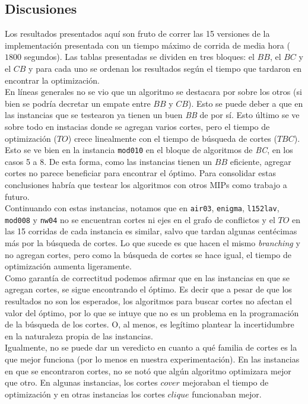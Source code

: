 \subsection{Discusiones}

Los resultados presentados aquí son fruto de correr las 15 versiones de la implementación presentada con un tiempo máximo de corrida de media hora ($1800$ segundos). Las tablas presentadas se dividen en tres bloques: el $BB$, el $BC$ y el $CB$ y para cada uno se ordenan los resultados según el tiempo que tardaron en encontrar la optimización.\\

En líneas generales no se vio que un algoritmo se destacara por sobre los otros (si bien se podría decretar un empate entre $BB$ y $CB$). Esto se puede deber a que en las instancias que se testearon ya tienen un buen \textit{BB} de por sí. Esto último se ve sobre todo en instacias donde se agregan varios cortes, pero el tiempo de optimización ($TO$) crece linealmente con el tiempo de búsqueda de cortes ($TBC$). Esto se ve bien en la instancia \verb_mod010_ en el bloque de algoritmos de \textit{BC}, en los casos 5 a 8. De esta forma, como las instancias tienen un $BB$ eficiente, agregar cortes no parece beneficiar para encontrar el óptimo. Para consolidar estas conclusiones habría que testear los algoritmos con otros MIPs como trabajo a futuro.\\

Continuando con estas instancias, notamos que en \verb_air03_, \verb_enigma_, \verb_l152lav_, \verb_mod008_  y \verb_nw04_ no se encuentran cortes ni ejes en el grafo de conflictos y el $TO$ en las 15 corridas de cada instancia es similar, salvo que tardan algunas centécimas más por la búsqueda de cortes. Lo que sucede es que hacen el mismo \emph{branching} y no agregan cortes, pero como la búsqueda de cortes se hace igual, el tiempo de optimización aumenta ligeramente.\\

Como garantía de correctitud podemos afirmar que en las instancias en que se agregan cortes, se sigue encontrando el óptimo. Es decir que a pesar de que los resultados no son los esperados, los algoritmos para buscar cortes no afectan el valor del óptimo, por lo que se intuye que no es un problema en la programación de la búsqueda de los cortes. O, al menos, es legítimo plantear la incertidumbre en la naturaleza propia de las instancias.\\

Igualmente, no se puede dar un veredicto en cuanto a qué familia de cortes es la que mejor funciona (por lo menos en nuestra experimentación). En las instancias en que se encontraron cortes, no se notó que algún algoritmo optimizara mejor que otro. En algunas instancias, los cortes $cover$ mejoraban el tiempo de optimización y en otras instancias los cortes $clique$ funcionaban mejor. \\

